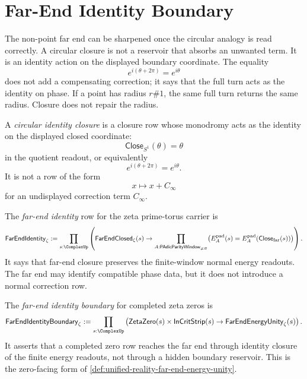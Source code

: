 \section{Far-End Identity Boundary}
\label{sec:unified-reality-far-end-identity-boundary}

The non-point far end can be sharpened once the circular analogy is read
correctly.  A circular closure is not a reservoir that absorbs an
unwanted term.  It is an identity action on the displayed boundary
coordinate.  The equality
$$
e^{i(\theta+2\pi)}=e^{i\theta}
$$
does not add a compensating correction; it says that the full turn acts
as the identity on phase.  If a point has radius $r\#1$, the same full
turn returns the same radius.  Closure does not repair the radius.

\begin{definition}
\label{def:unified-reality-circular-identity-closure}
A \emph{circular identity closure} is a closure row whose monodromy acts
as the identity on the displayed closed coordinate:
$$
\mathsf{Close}_{S^1}(\theta)=\theta
$$
in the quotient readout, or equivalently
$$
e^{i(\theta+2\pi)}=e^{i\theta}.
$$
It is not a row of the form
$$
x\longmapsto x+C_{\infty}
$$
for an undisplayed correction term $C_{\infty}$.
\end{definition}

\begin{definition}
\label{def:unified-reality-far-end-identity}
The \emph{far-end identity} row for the zeta prime-torus carrier is
$$
\mathsf{FarEndIdentity}_{\zeta}
:=
\prod_{s:\ComplexUp}
\left(
\mathsf{FarEndClosed}_{\zeta}(s)
\to
\prod_{A:\mathsf{PAdicParityWindow}_{\ne\varnothing}}
\bigl(
E_A^{\mathrm{pad}}(s)
=
E_A^{\mathrm{pad}}(\mathsf{Close}_{\mathrm{far}}(s))
\bigr)
\right).
$$
It says that far-end closure preserves the finite-window normal energy
readouts.  The far end may identify compatible phase data, but it does
not introduce a normal correction row.
\end{definition}

\begin{definition}
\label{def:unified-reality-far-end-identity-boundary-zeros}
The \emph{far-end identity boundary} for completed zeta zeros is
$$
\mathsf{FarEndIdentityBoundary}_{\zeta}
:=
\prod_{s:\ComplexUp}
\left(
\mathsf{ZetaZero}(s)
\times
\mathsf{InCritStrip}(s)
\to
\mathsf{FarEndEnergyUnity}_{\zeta}(s)
\right).
$$
It asserts that a completed zero row reaches the far end through identity
closure of the finite energy readouts, not through a hidden boundary
reservoir.  This is the zero-facing form of
\autoref{def:unified-reality-far-end-energy-unity}.
\end{definition}

